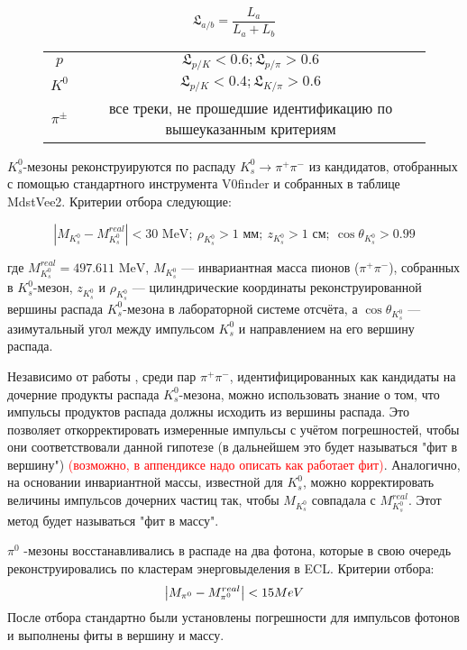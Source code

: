 $$\mathfrak{L}_{a/b} = \frac{L_a}{L_a + L_b}$$

\begin{figure}[h]
    \centering
    \begin{tabular}{c|c}
        $p$   & $\mathfrak{L}_{p/K} < 0.6; \mathfrak{L}_{p/\pi} > 0.6$ \\
        $K^0$   & $\mathfrak{L}_{p/K} < 0.4; \mathfrak{L}_{K/\pi} > 0.6$ \\
        $\pi^{\pm}$ & все треки, не прошедшие идентификацию по вышеуказанным критериям
    \end{tabular}
\end{figure}

\newdot $K_s^0$-мезоны реконструируются по распаду $K_s^0 \to \pi^+ \pi^-$ из кандидатов, отобранных с помощью стандартного инструмента V0finder и собранных в таблице MdstVee2. Критерии отбора следующие:

$$
\left| M_{K_s^0} - M^{real}_{K_s^0} \right| < 30 \text{ MeV}; \ \rho_{K_s^0} > 1 \text{ мм}; \ z_{K_s^0} > 1 \text{ см}; \ \cos \theta_{K_s^0} > 0.99
$$

где $M^{real}_{K_s^0} = 497.611 \text{ MeV}$, $M_{K_s^0}$ — инвариантная масса пионов ($\pi^+ \pi^-$), собранных в $K_s^0$-мезон, $z_{K_s^0}$ и $\rho_{K_s^0}$ — цилиндрические координаты реконструированной вершины распада $K_s^0$-мезона в лабораторной системе отсчёта, а $\cos \theta_{K_s^0}$ — азимутальный угол между импульсом $K_s^0$ и направлением на его вершину распада.

Независимо от работы \cite*{BelleDetector2002}, среди пар $\pi^+ \pi^-$, идентифицированных как кандидаты на дочерние продукты распада $K_s^0$-мезона, можно использовать знание о том, что импульсы продуктов распада должны исходить из вершины распада. Это позволяет откорректировать измеренные импульсы с учётом погрешностей, чтобы они соответствовали данной гипотезе (в дальнейшем это будет называться "фит в вершину") 
\textcolor{red}{(возможно, в аппендиксе надо описать как работает фит)}. Аналогично, на основании инвариантной массы, известной для $K_s^0$, можно корректировать величины импульсов дочерних частиц так, чтобы $M_{K_s^0}$ совпадала с $M^{real}_{K_s^0}$. Этот метод будет называться "фит в массу".

\newdot $\pi^0$ -мезоны восстанавливались в распаде на два фотона, которые в
свою очередь реконструировались по кластерам энерговыделения в ECL.
Критерии отбора:
$$
\abs{M_{\pi^0} - M_{\pi^0}^{real}} < 15 MeV 
$$
После отбора стандартно были установлены погрешности для импульсов фотонов и выполнены фиты в вершину и массу.

